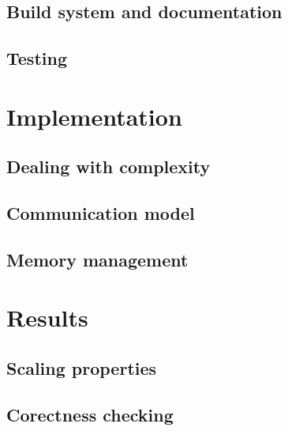 \documentclass[11pt,a4paper]{article}
\begin{document}
\subsection{Build system and documentation}
\subsection{Testing}

\section{Implementation}
\subsection{Dealing with complexity}
\subsection{Communication model}
\subsection{Memory management}

\section{Results}
\subsection{Scaling properties}
\subsection{Corectness checking}
\end{document}
